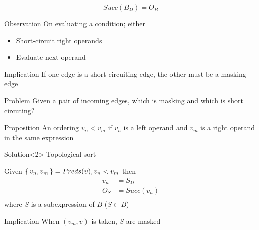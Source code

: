 \documentclass[xcolor = {dvipsnames, table}, aspectratio=169]{beamer}
\begin{document}
\begin{frame}
    \begin{equation*}
        Succ(B_\Omega) = O_B
    \end{equation*}

    \begin{block}{Observation}
        On evaluating a condition; either
        \begin{itemize}
            \item Short-circuit right operands
            \item Evaluate next operand
        \end{itemize}
    \end{block}

    \begin{block}{Implication}
        If one edge is a short circuiting edge, the other must be a masking
        edge
    \end{block}
\end{frame}

\begin{frame}
    \begin{block}{Problem}
        Given a pair of incoming edges, which is masking and which is short
        circuting?
    \end{block}

    \begin{block}{Proposition}
        An ordering $v_n < v_m$ if $v_n$ is a left operand and $v_m$ is
        a right operand in the same expression
    \end{block}

    \begin{block}{Solution}<2>
        Topological sort
    \end{block}
\end{frame}

\begin{frame}
    Given $\set{v_n, v_m} = Preds(v), v_n < v_m$ then
    \begin{align*}
        v_n &= S_\Omega \\
        O_S &= Succ(v_n) \\
    \end{align*}
    where $S$ is a subexpression of $B$ ($S \subset B$)

    \begin{block}{Implication}
        When $(v_m, v)$ is taken, $S$ are masked
    \end{block}
\end{frame}
\end{document}
